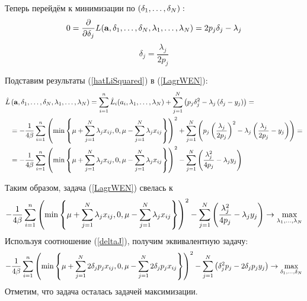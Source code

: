 Теперь перейдём к минимизации по $\left(\delta_1, \ldots, \delta_N\right):$
\begin{equation}
	0 = \frac{\partial}{\partial\delta_j}L(\boldsymbol{\mathbf{a}},\delta_{1},\ldots,\delta_{N}, \lambda_{1},\ldots,\lambda_{N}) = 2p_j\delta_j - \lambda_j 
\end{equation}
\begin{equation}
	\label{deltaJ}
	\delta_j = \frac{\lambda_j}{2p_j}
\end{equation}

Подставим результаты (\ref{hatLiSquared}) в (\ref{LagrWEN}):
\begin{align} 
	\hat L&\left(\boldsymbol{\mathbf{a}},\delta_{1},\ldots,\delta_{N}, \lambda_{1},\ldots,\lambda_{N}\right) 
		= \sum\limits_{i=1}^n \hat L_i(a_i,\lambda_{1},\ldots,\lambda_{N})
		+ \sum\limits_{j=1}^N \left(p_j\delta_j^2  - \lambda_j\left(\delta_j - y_j\right)\right) = \\
		&= -\frac1{4\beta} \sum\limits_{i=1}^n \left(\mathop{\mbox{min}}\limits\left\{\mu + \sum\limits_{j=1}^N\lambda_jx_{ij}, 0, \mu-\sum\limits_{j=1}^N\lambda_jx_{ij}\right\}\right)^2
		+ \sum\limits_{j=1}^N \left(p_j\left(\frac{\lambda_j}{2p_j}\right)^2  - \lambda_j\left(\frac{\lambda_j}{2p_j} - y_j\right)\right) = \\
		&= -\frac1{4\beta} \sum\limits_{i=1}^n \left(\mathop{\mbox{min}}\limits\left\{\mu + \sum\limits_{j=1}^N\lambda_jx_{ij}, 0, \mu - \sum\limits_{j=1}^N\lambda_jx_{ij}\right\}\right)^2
		- \sum\limits_{j=1}^N \left( \frac{\lambda_j^2}{4p_j}  - \lambda_j y_j\right) 
\end{align}

Таким образом, задача (\ref{LagrWEN}) свелась к 
\begin{align}
-\frac1{4\beta} \sum\limits_{i=1}^n \left(\mathop{\mbox{min}}\limits\left\{\mu + \sum\limits_{j=1}^N\lambda_jx_{ij}, 0, \mu - \sum\limits_{j=1}^N\lambda_jx_{ij}\right\}\right)^2
		- \sum\limits_{j=1}^N \left( \frac{\lambda_j^2}{4p_j}  - \lambda_j y_j\right) \to \mathop{\mbox{max}}\limits_{\lambda_{1},\ldots,\lambda_{N}}
\end{align}
Используя соотношение (\ref{deltaJ}), получим эквивалентную задачу:
\begin{align} 
	-\frac1{4\beta} \sum\limits_{i=1}^n \left(\mathop{\mbox{min}}\limits\left\{\mu + \sum\limits_{j=1}^N2 \delta_j p_jx_{ij}, 0, \mu-\sum\limits_{j=1}^N2 \delta_j p_jx_{ij}\right\}\right)^2
		- \sum\limits_{j=1}^N \left( \delta_j^2 p_j  - 2\delta_j p_j y_j\right) \to \mathop{\mbox{max}}\limits_{\delta_{1},\ldots,\delta_{N}}
\end{align}
Отметим, что задача осталась задачей максимизации.

